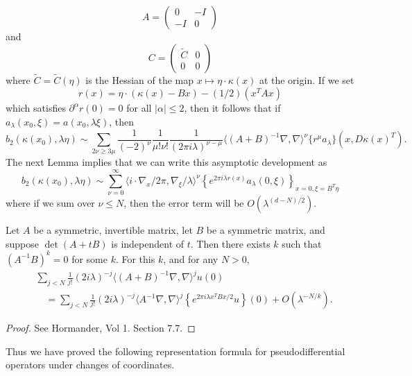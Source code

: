 %
\[ A = \begin{pmatrix} 0 & -I \\ -I & 0 \end{pmatrix} \]
%
and
%
\[ C = \begin{pmatrix} \tilde{C} & 0 \\ 0 & 0 \end{pmatrix} \]
%
where $\tilde{C} = \tilde{C}(\eta)$ is the Hessian of the map $x \mapsto \eta \cdot \kappa(x)$ at the origin. If we set
%
\[ r(x) = \eta \cdot (\kappa(x) - Bx) - (1/2)(x^T A x) \]
%
which satisfies $\partial^\alpha r(0) = 0$ for all $|\alpha| \leq 2$, then it follows that if $a_\lambda(x_0,\xi) = a(x_0,\lambda \xi)$, then
\[ b_2(\kappa(x_0),\lambda \eta) \sim \sum_{2 \nu \geq 3 \mu} \frac{1}{(-2)^\nu} \frac{1}{\mu! \nu!} \frac{1}{(2\pi i \lambda)^{\nu - \mu}} \langle (A + B)^{-1} \nabla, \nabla \rangle^\nu \{ r^\mu a_\lambda \}(x, D\kappa(x)^T). \]
%
The next Lemma implies that we can write this asymptotic development as
%
\[ b_2(\kappa(x_0),\lambda \eta) \sim \sum_{\nu = 0}^\infty \langle i \cdot \nabla_x / 2\pi, \nabla_\xi / \lambda \rangle^\nu \left\{ e^{2 \pi i \lambda r(x)} a_\lambda(0,\xi) \right\}_{x = 0, \xi = B^T \eta} \]
%
where if we sum over $\nu \leq N$, then the error term will be $O(\lambda^{(d-N)/2})$.

\begin{lemma}
    Let $A$ be a symmetric, invertible matrix, let $B$ be a symmetric matrix, and suppose $\det(A + tB)$ is independent of $t$. Then there exists $k$ such that $(A^{-1}B)^k = 0$ for some $k$. For this $k$, and for any $N > 0$,
    \begin{align*}
        &\sum_{j < N} \frac{1}{j!} (2 i \lambda)^{-j} \langle (A + B)^{-1} \nabla, \nabla \rangle^j u(0)\\
        &\quad= \sum_{j < N} \frac{1}{j!} (2 i \lambda)^{-j} \langle A^{-1}\nabla, \nabla \rangle^j \left\{ e^{2 \pi i \lambda x^T B x / 2} u \right\}(0) + O(\lambda^{-N/k}).
    \end{align*}
\end{lemma}
\begin{proof}
    See Hormander, Vol 1. Section 7.7.
\end{proof}

Thus we have proved the following representation formula for pseudodifferential operators under changes of coordinates.

